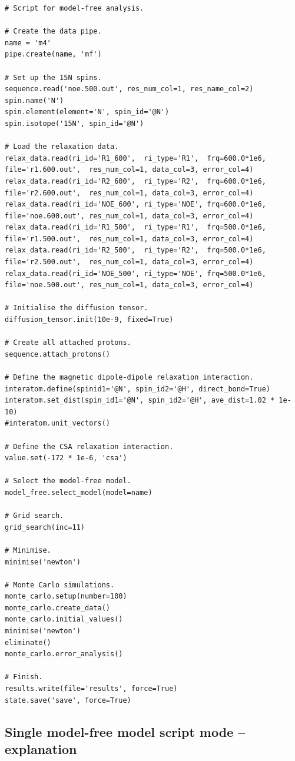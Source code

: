 \begin{htmlonly}
\begin{htmlonly}
\begin{lstlisting}
# Script for model-free analysis.

# Create the data pipe.
name = 'm4'
pipe.create(name, 'mf')

# Set up the 15N spins.
sequence.read('noe.500.out', res_num_col=1, res_name_col=2)
spin.name('N')
spin.element(element='N', spin_id='@N')
spin.isotope('15N', spin_id='@N')

# Load the relaxation data.
relax_data.read(ri_id='R1_600',  ri_type='R1',  frq=600.0*1e6, file='r1.600.out',  res_num_col=1, data_col=3, error_col=4)
relax_data.read(ri_id='R2_600',  ri_type='R2',  frq=600.0*1e6, file='r2.600.out',  res_num_col=1, data_col=3, error_col=4)
relax_data.read(ri_id='NOE_600', ri_type='NOE', frq=600.0*1e6, file='noe.600.out', res_num_col=1, data_col=3, error_col=4)
relax_data.read(ri_id='R1_500',  ri_type='R1',  frq=500.0*1e6, file='r1.500.out',  res_num_col=1, data_col=3, error_col=4)
relax_data.read(ri_id='R2_500',  ri_type='R2',  frq=500.0*1e6, file='r2.500.out',  res_num_col=1, data_col=3, error_col=4)
relax_data.read(ri_id='NOE_500', ri_type='NOE', frq=500.0*1e6, file='noe.500.out', res_num_col=1, data_col=3, error_col=4)

# Initialise the diffusion tensor.
diffusion_tensor.init(10e-9, fixed=True)

# Create all attached protons.
sequence.attach_protons()

# Define the magnetic dipole-dipole relaxation interaction.
interatom.define(spinid1='@N', spin_id2='@H', direct_bond=True)
interatom.set_dist(spin_id1='@N', spin_id2='@H', ave_dist=1.02 * 1e-10)
#interatom.unit_vectors()

# Define the CSA relaxation interaction.
value.set(-172 * 1e-6, 'csa')

# Select the model-free model.
model_free.select_model(model=name)

# Grid search.
grid_search(inc=11)

# Minimise.
minimise('newton')

# Monte Carlo simulations.
monte_carlo.setup(number=100)
monte_carlo.create_data()
monte_carlo.initial_values()
minimise('newton')
eliminate()
monte_carlo.error_analysis()

# Finish.
results.write(file='results', force=True)
state.save('save', force=True)
\end{lstlisting}



\subsection{Single model-free model script mode -- explanation}


\end{htmlonly}
\end{htmlonly}
